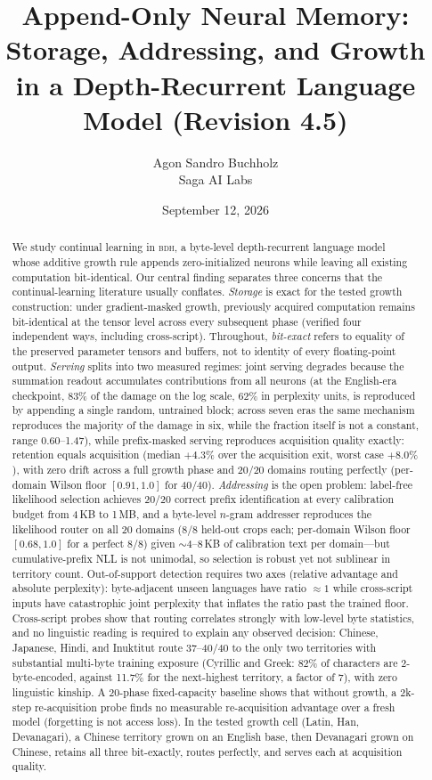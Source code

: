\documentclass[11pt]{article}
\title{\bfseries Append-Only Neural Memory: Storage, Addressing, and Growth\\ \large in a Depth-Recurrent Language Model \textnormal{(Revision 4.5)}}
\author{Agon Sandro Buchholz\\\small Saga AI Labs}
\date{September 12, 2026}
\theoremstyle{definition}\newtheorem{definition}{Definition}
\theoremstyle{remark}\newtheorem{remark}{Remark}
\newcommand{\BDH}{\textsc{bdh}}
\begin{document}
\maketitle

\begin{abstract}
We study continual learning in \BDH{}, a byte-level depth-recurrent language
model~\cite{bdh} whose additive growth rule appends zero-initialized neurons while leaving all existing computation bit-identical. Our central finding separates three concerns that the continual-learning literature usually conflates.
\emph{Storage} is exact for the tested growth construction: under gradient-masked growth, previously acquired computation remains bit-identical at the tensor level across every subsequent phase (verified four independent ways, including cross-script). Throughout, \emph{bit-exact} refers to equality of the preserved parameter tensors and buffers, not to identity of every floating-point output.
\emph{Serving} splits into two measured regimes: joint serving degrades because the summation readout accumulates contributions from all neurons (at the English-era checkpoint, 83\% of the damage on the log scale, 62\% in perplexity units, is reproduced by appending a single random, untrained block; across seven eras the same mechanism reproduces the majority of the damage in six, while the fraction itself is not a constant, range 0.60--1.47), while prefix-masked serving reproduces acquisition quality exactly: retention equals acquisition (median $+4.3\%$ over the acquisition exit, worst case $+8.0\%$), with zero drift across a full growth phase and 20/20 domains routing perfectly (per-domain Wilson floor $[0.91,1.0]$ for 40/40).
\emph{Addressing} is the open problem: label-free likelihood selection achieves 20/20 correct prefix identification at every calibration budget from 4\,KB to 1\,MB, and a byte-level $n$-gram addresser reproduces the likelihood router on all 20 domains (8/8 held-out crops each; per-domain Wilson floor $[0.68, 1.0]$ for a perfect 8/8) given $\sim$4--8\,KB of calibration text per domain---but cumulative-prefix NLL is not unimodal, so selection is robust yet not sublinear in territory count. Out-of-support detection requires two axes (relative advantage and absolute perplexity): byte-adjacent unseen languages have ratio $\approx 1$ while cross-script inputs have catastrophic joint perplexity that inflates the ratio past the trained floor. Cross-script probes show that routing correlates strongly with low-level byte statistics, and no linguistic reading is required to explain any observed decision: Chinese, Japanese, Hindi, and Inuktitut route 37--40/40 to the only two territories with substantial multi-byte training exposure (Cyrillic and Greek: 82\% of characters are 2-byte-encoded, against 11.7\% for the next-highest territory, a factor of 7), with zero linguistic kinship. A 20-phase fixed-capacity baseline shows that without growth, a 2k-step re-acquisition probe finds no measurable re-acquisition advantage over a fresh model (forgetting is not access loss). In the tested growth cell (Latin, Han, Devanagari), a Chinese territory grown on an English base, then Devanagari grown on Chinese, retains all three bit-exactly, routes perfectly, and serves each at acquisition quality.

\end{abstract}
\end{document}
